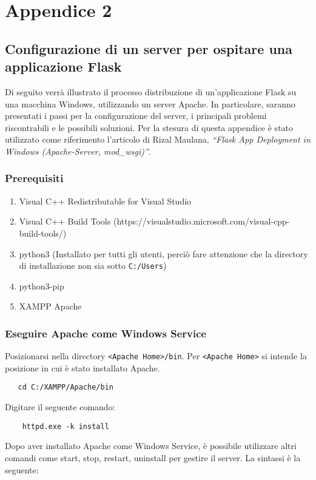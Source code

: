 \chapter*{Appendice 2}
\label{ch:appendice2}

\section*{Configurazione di un server per ospitare una applicazione Flask}

Di seguito verrà illustrato il processo distribuzione di un’applicazione Flask su una macchina Windows, utilizzando un server Apache. 
In particolare, saranno presentati i passi per la configurazione del server, i principali problemi riscontrabili e le possibili soluzioni.
Per la stesura di questa appendice è stato utilizzato come riferimento l’articolo di Rizal Maulana, \textit{“Flask App Deployment in Windows (Apache-Server, mod\_wsgi)”}\cite{apacheFlask}.

\subsection*{Prerequisiti}

\begin{enumerate}
    \item Visual C++ Redistributable for Visual Studio
    \item Visual C++ Build Tools (https://visualstudio.microsoft.com/visual-cpp-build-tools/)
    \item python3 (Installato per tutti gli utenti, perciò fare attenzione che la directory di installazione non sia sotto  \verb|C:/Users|)
    \item python3-pip
    \item XAMPP Apache
\end{enumerate}

\subsection*{Eseguire Apache come Windows Service}

Posizionarsi nella directory \verb|<Apache Home>/bin|. Per \verb|<Apache Home>| si intende la posizione in cui è stato installato Apache.

\begin{verbatim}
   cd C:/XAMPP/Apache/bin 
\end{verbatim}
Digitare il seguente comando:

\begin{verbatim}
    httpd.exe -k install
\end{verbatim}
Dopo aver installato Apache come Windows Service, è possibile utilizzare altri comandi come start, stop, restart, uninstall per gestire il server. La sintassi è la seguente:

